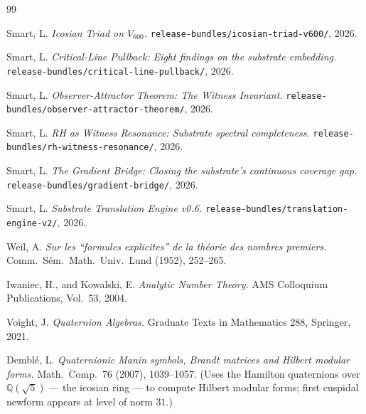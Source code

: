 \documentclass[11pt,a4paper]{article}
\theoremstyle{definition}
\newcommand{\Q}{\mathbb{Q}}
\begin{document}
\begin{thebibliography}{99}

Smart, L. \emph{Icosian Triad on $V_{600}$.}
\texttt{release-bundles/icosian-triad-v600/}, 2026.

Smart, L. \emph{Critical-Line Pullback: Eight findings on the substrate
embedding.} \texttt{release-bundles/critical-line-pullback/}, 2026.

Smart, L. \emph{Observer-Attractor Theorem: The Witness Invariant.}
\texttt{release-bundles/observer-attractor-theorem/}, 2026.

Smart, L. \emph{RH as Witness Resonance: Substrate spectral completeness.}
\texttt{release-bundles/rh-witness-resonance/}, 2026.

Smart, L. \emph{The Gradient Bridge: Closing the substrate's continuous
coverage gap.} \texttt{release-bundles/gradient-bridge/}, 2026.

Smart, L. \emph{Substrate Translation Engine v0.6.}
\texttt{release-bundles/translation-engine-v2/}, 2026.

Weil, A. \emph{Sur les ``formules explicites'' de la th\'eorie des nombres
premiers.} Comm.\ S\'em.\ Math.\ Univ.\ Lund (1952), 252--265.

Iwaniec, H., and Kowalski, E. \emph{Analytic Number Theory.}
AMS Colloquium Publications, Vol.\ 53, 2004.

Voight, J. \emph{Quaternion Algebras.} Graduate Texts in Mathematics 288,
Springer, 2021.

Dembl\'e, L. \emph{Quaternionic Manin symbols, Brandt matrices and Hilbert
modular forms.} Math.\ Comp.\ 76 (2007), 1039--1057. (Uses the Hamilton
quaternions over $\Q(\sqrt 5)$ --- the icosian ring --- to compute Hilbert
modular forms; first cuspidal newform appears at level of norm $31$.)

\end{thebibliography}
\end{document}
